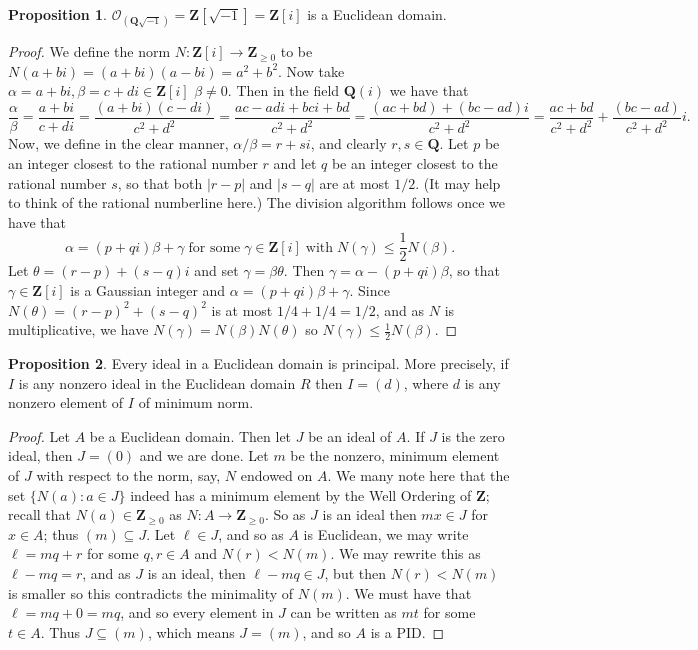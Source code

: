 \documentclass[9pt,reqno]{amsart}
\theoremstyle{definition}
\newtheorem{prop}{Proposition}[section]
\newcommand{\zz}{\mathbf Z}
\newcommand{\qq}{\mathbf Q}
\begin{document}
\begin{prop}
$\mathcal{O}_{(\qq \sqrt{-1})} 	 = \zz[\sqrt{-1} ] = \zz[i]$ is a Euclidean domain.
\end{prop}
\begin{proof}
	We define the norm $N \colon \zz[i] \to \zz_{\geq 0}$ to be $N (a+bi)= (a+bi)(a-bi) = a^2 +b^2$. Now take $\alpha = a+bi, \beta = c+di \in \zz[i]$ $\beta \neq 0$. Then in the field $\qq (i)$ we have that $$\frac{\alpha}{\beta} = \frac{a+bi}{c+di} = \frac{(a+bi)(c-di)}{c^2+d^2} = \frac{ac-adi+bci+bd}{c^2+d^2} = \frac{(ac+bd) +(bc-ad)i}{c^2+d^2} = \frac{ac+bd}{c^2+d^2} + \frac{(bc-ad)}{c^2+d^2}i.$$ Now, we define in the clear manner, $\alpha/ \beta = r+si$, and clearly $r, s \in \qq$. Let $p$ be an integer closest to the rational number $r$ and let $q$ be an integer closest to the rational number $s$, so that both $|r-p|$ and $|s-q|$ are at most $1/2$. (It may help to think of the rational numberline here.) The division algorithm follows once we have that $$ \alpha = (p+qi) \beta + \gamma \; \text{for some} \; \gamma \in \zz[i] \; \text{with} \; N(\gamma) \leq \frac{1}{2} N(\beta).$$ Let $\theta = (r-p) + (s-q)i$ and set $\gamma = \beta \theta$. Then $\gamma = \alpha - (p+qi) \beta$, so that $\gamma \in \zz[i]$ is a Gaussian integer and $\alpha = (p+qi) \beta + \gamma$. Since $N( \theta) = (r-p)^2 + (s-q)^2$ is at most $1/4 + 1/4 = 1/2$, and as $N$ is multiplicative, we have $N ( \gamma) = N(\beta) N(\theta)$ so $N(\gamma) \leq \frac{1}{2} N(\beta)$. 
	\end{proof}
\begin{prop}
Every ideal in a Euclidean domain is principal. More precisely, if $I$ is any nonzero ideal in the Euclidean domain $R$ then $I = (d)$, where $d$ is any nonzero element of $I$ of minimum norm. 	
\end{prop}
\begin{proof}
	Let $A$ be a Euclidean domain. Then let $J$ be an ideal of $A$. If $J$ is the zero ideal, then $J = (0)$ and we are done. Let $m$ be the nonzero, minimum element of $J$ with respect to the norm, say, $N$ endowed on $A$. We many note here that the set $\{N (a) \colon a \in J \}$ indeed has a minimum element by the Well Ordering of $\zz$; recall that $N(a) \in \zz_{\geq 0}$ as $N \colon A \to \zz_{\geq 0}$. So as $J$ is an ideal then $mx \in J$ for $x \in A$; thus $(m) \subseteq J$. Let $\ell \in J$, and so as $A$ is Euclidean, we may write $\ell = mq + r$ for some $q, r \in A$ and $N(r) < N(m)$. We may rewrite this as $\ell - mq = r$, and as $J$ is an ideal, then $\ell - mq \in J$, but then $N(r) < N(m)$ is smaller so this contradicts the minimality of $N(m)$. We must have that $\ell = mq + 0 = mq$, and so every element in $J$ can be written as $mt$ for some $t \in A$. Thus $J \subseteq (m)$, which means $J = (m)$, and so $A$ is a PID. 
\end{proof}
\end{document}
